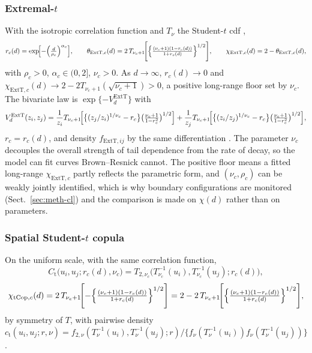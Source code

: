 \subsubsection{Extremal-\texorpdfstring{$t$}{t}}\label{sec:meth-extt}

With the isotropic correlation function and \(T_\nu\) the Student-\(t\) cdf \citep{opitz2013,demarta2005},
\begin{equation}\label{eq:meth-extt-theta}
  r_c(d)=\exp\!\Bigl[-\Bigl(\tfrac{d}{\rho_c}\Bigr)^{\alpha_c}\Bigr],
  \qquad
  \theta_{\mathrm{ExtT},c}(d)=2\,T_{\nu_c+1}\!\Biggl[\Bigl\{\tfrac{(\nu_c+1)(1-r_c(d))}{1+r_c(d)}\Bigr\}^{1/2}\Biggr],
  \qquad
  \chi_{\mathrm{ExtT},c}(d)=2-\theta_{\mathrm{ExtT},c}(d),
\end{equation}
with \(\rho_c>0\), \(\alpha_c\in(0,2]\), \(\nu_c>0\). As \(d\to\infty\), \(r_c(d)\to0\) and \(\chi_{\mathrm{ExtT},c}(d)\to2-2T_{\nu_c+1}(\sqrt{\nu_c+1})>0\), a positive long-range floor set by \(\nu_c\). The bivariate law is \(\exp\{-V^{\mathrm{ExtT}}_d\}\) with
\begin{equation}
  V^{\mathrm{ExtT}}_d(z_i,z_j)
  =\frac{1}{z_i}T_{\nu_c+1}\!\Bigl[\bigl\{(z_j/z_i)^{1/\nu_c}-r_c\bigr\}\bigl(\tfrac{\nu_c+1}{1-r_c^2}\bigr)^{1/2}\Bigr]
  +\frac{1}{z_j}T_{\nu_c+1}\!\Bigl[\bigl\{(z_i/z_j)^{1/\nu_c}-r_c\bigr\}\bigl(\tfrac{\nu_c+1}{1-r_c^2}\bigr)^{1/2}\Bigr],
\end{equation}
\(r_c=r_c(d)\), and density \(f_{\mathrm{ExtT},ij}\) by the same differentiation \citep{opitz2013}. The parameter \(\nu_c\) decouples the overall strength of tail dependence from the rate of decay, so the model can fit curves Brown--Resnick cannot. The positive floor means a fitted long-range \(\chi_{\mathrm{ExtT},c}\) partly reflects the parametric form, and \((\nu_c,\rho_c)\) can be weakly jointly identified, which is why boundary configurations are monitored (Sect.~\ref{sec:meth-cl}) and the comparison is made on \(\chi(d)\) rather than on parameters.

\subsubsection{Spatial Student-\texorpdfstring{$t$}{t} copula}\label{sec:meth-tcop}

On the uniform scale, with the same correlation function,
\begin{equation}
  C_{\mathrm t}\bigl(u_i,u_j;r_c(d),\nu_c\bigr)
  =T_{2,\nu_c}\!\bigl(T^{-1}_{\nu_c}(u_i),T^{-1}_{\nu_c}(u_j);r_c(d)\bigr),
\end{equation}
\begin{equation}\label{eq:meth-tcop-chi}
  \chi_{\mathrm{tCop},c}(d)
  =2\,T_{\nu_c+1}\!\Biggl[-\Bigl\{\tfrac{(\nu_c+1)(1-r_c(d))}{1+r_c(d)}\Bigr\}^{1/2}\Biggr]
  =2-2\,T_{\nu_c+1}\!\Biggl[\Bigl\{\tfrac{(\nu_c+1)(1-r_c(d))}{1+r_c(d)}\Bigr\}^{1/2}\Biggr],
\end{equation}
by symmetry of \(T\), with pairwise density \(c_{\mathrm t}(u_i,u_j;r,\nu)=f_{2,\nu}(T^{-1}_\nu(u_i),T^{-1}_\nu(u_j);r)/\{f_\nu(T^{-1}_\nu(u_i))f_\nu(T^{-1}_\nu(u_j))\}\).

